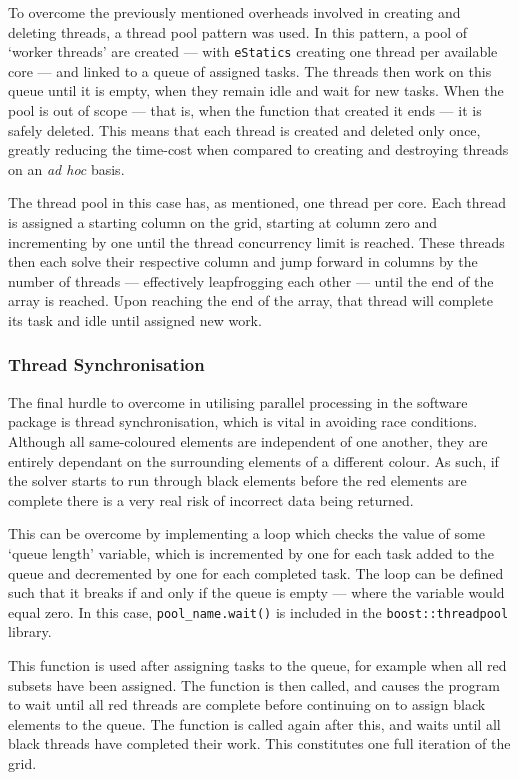 			To overcome the previously mentioned overheads involved in creating and deleting threads, a thread pool pattern was used. In this pattern, a pool of `worker threads' are created --- with \lstinline|eStatics| creating one thread per available core --- and linked to a queue of assigned tasks. The threads then work on this queue until it is empty, when they remain idle and wait for new tasks. When the pool is out of scope --- that is, when the function that created it ends --- it is safely deleted. This means that each thread is created and deleted only once, greatly reducing the time-cost when compared to creating and destroying threads on an \textit{ad hoc} basis.
			
			The thread pool in this case has, as mentioned, one thread per core. Each thread is assigned a starting column on the grid, starting at column zero and incrementing by one until the thread concurrency limit is reached. These threads then each solve their respective column and jump forward in columns by the number of threads --- effectively leapfrogging each other --- until the end of the array is reached. Upon reaching the end of the array, that thread will complete its task and idle until assigned new work.
			
		\subsubsection{Thread Synchronisation}
		
			The final hurdle to overcome in utilising parallel processing in the software package is thread synchronisation, which is vital in avoiding race conditions. Although all same-coloured elements are independent of one another, they are entirely dependant on the surrounding elements of a different colour. As such, if the solver starts to run through black elements before the red elements are complete there is a very real risk of incorrect data being returned.
			
			This can be overcome by implementing a loop which checks the value of some `queue length' variable, which is incremented by one for each task added to the queue and decremented by one for each completed task. The loop can be defined such that it breaks if and only if the queue is empty --- where the variable would equal zero. In this case, \lstinline|pool_name.wait()| is included in the \lstinline|boost::threadpool| library.
			
			This function is used after assigning tasks to the queue, for example when all red subsets have been assigned. The function is then called, and causes the program to wait until all red threads are complete before continuing on to assign black elements to the queue. The function is called again after this, and waits until all black threads have completed their work. This constitutes one full iteration of the grid.
	
